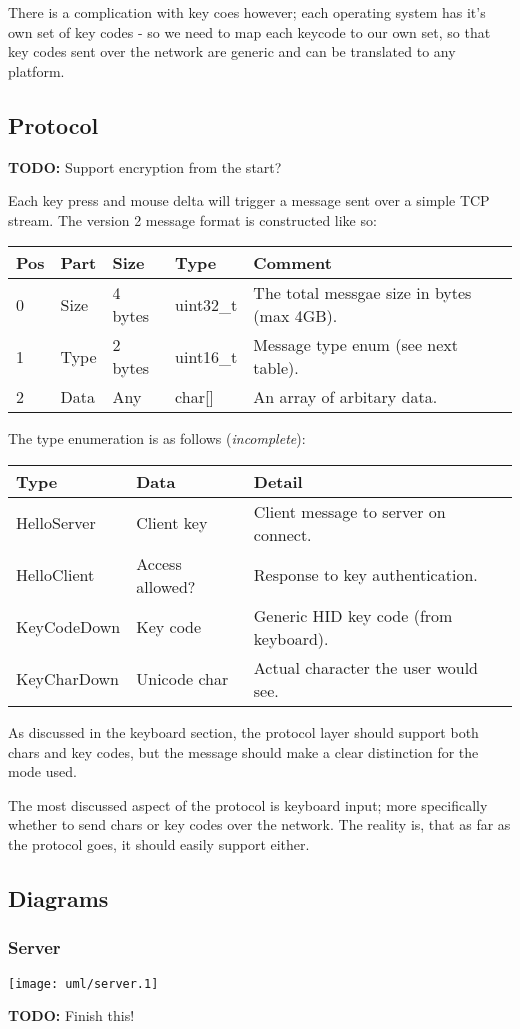 There is a complication with key coes however; each operating system has it's
own set of key codes - so we need to map each keycode to our own set, so that
key codes sent over the network are generic and can be translated to any 
platform.

\subsection{Protocol}

\textbf{TODO:} Support encryption from the start?

Each key press and mouse delta will trigger a message sent over a simple TCP 
stream. The version 2 message format is constructed like so:

\begin{tabular}{|l|l|l|l|l|}
\hline
\textbf{Pos} &
\textbf{Part} &
\textbf{Size} &
\textbf{Type} &
\textbf{Comment} \\
\hline
0 & Size & 4 bytes & uint32\_t & The total messgae size in bytes (max 4GB). \\
1 & Type & 2 bytes & uint16\_t & Message type enum (see next table). \\
2 & Data & Any & char[] & An array of arbitary data. \\
\hline
\end{tabular}

The type enumeration is as follows (\textit{incomplete}):

\begin{tabular}{|l|l|l|}
\hline
\textbf{Type} &
\textbf{Data} &
\textbf{Detail} \\
\hline
HelloServer & Client key & Client message to server on connect. \\
HelloClient & Access allowed? & Response to key authentication. \\
KeyCodeDown & Key code & Generic HID key code (from keyboard). \\
KeyCharDown & Unicode char & Actual character the user would see. \\
\hline
\end{tabular}

As discussed in the keyboard section, the protocol layer should support both
chars and key codes, but the message should make a clear distinction for the
mode used.

The most discussed aspect of the protocol is keyboard input; more specifically
whether to send chars or key codes over the network. The reality is, that as far
as the protocol goes, it should easily support either.

\subsection{Diagrams}

\subsubsection{Server}

\texttt{[image: uml/server.1]}

\textbf{TODO:} Finish this!
